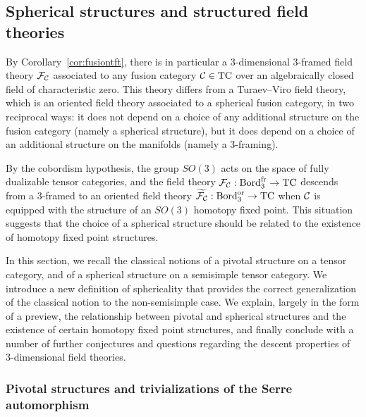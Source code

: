 \documentclass{amsart}
\begin{document}
\subsection{Spherical structures and structured field theories} \label{sec:spherical}


By Corollary~\ref{cor:fusiontft}, there is in particular a 3-dimensional 3-framed field theory $\mathcal F_\mathcal C$ associated to any fusion category $\mathcal C\in \mathrm{TC}$ over an algebraically closed field of characteristic zero.  This theory differs from a Turaev--Viro field theory, which is an oriented field theory associated to a spherical fusion category, in two reciprocal ways: it does not depend on a choice of any additional structure on the fusion category (namely a spherical structure), but it does depend on a choice of an additional structure on the manifolds (namely a 3-framing).  

By the cobordism hypothesis, the group $SO(3)$ acts on the space of fully dualizable tensor categories, and the field theory $\mathcal F_\mathcal C : \mathrm{Bord}^\mathrm{fr}_3 \rightarrow \mathrm{TC}$ descends from a 3-framed to an oriented field theory $\widetilde{\mathcal F_\mathcal C} : \mathrm{Bord}^\mathrm{or}_3 \rightarrow \mathrm{TC}$ when $\mathcal C$ is equipped with the structure of an $SO(3)$ homotopy fixed point.  This situation suggests that the choice of a spherical structure should be related to the existence of homotopy fixed point structures.  

In this section, we recall the classical notions of a pivotal structure on a tensor category, and of a spherical structure on a semisimple tensor category.  We introduce a new definition of sphericality that provides the correct generalization of the classical notion to the non-semisimple case.  We explain, largely in the form of a preview, the relationship between pivotal and spherical structures and the existence of certain homotopy fixed point structures, and finally conclude with a number of further conjectures and questions regarding the descent properties of 3-dimensional field theories.




\subsubsection{Pivotal structures and trivializations of the Serre automorphism}
\end{document}
